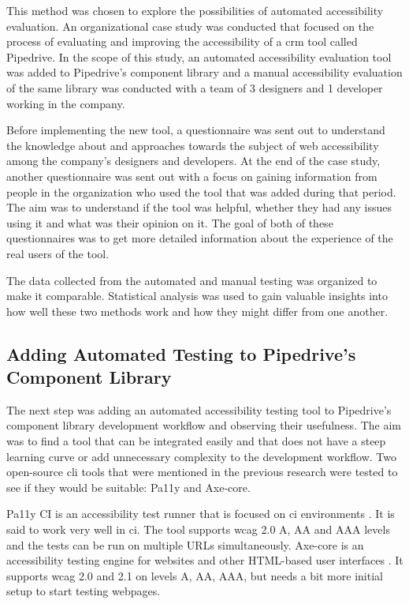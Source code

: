 \documentclass{master_thesis}
\begin{document}
This method was chosen to explore the possibilities of automated accessibility evaluation. An organizational case study was conducted that focused on the process of evaluating and improving the accessibility of a \ac{crm} tool called Pipedrive. In the scope of this study, an automated accessibility evaluation tool was added to Pipedrive's component library and a manual accessibility evaluation of the same library was conducted with a team of 3 designers and 1 developer working in the company.

Before implementing the new tool, a questionnaire was sent out to understand the knowledge about and approaches towards the subject of web accessibility among the company's designers and developers. At the end of the case study, another questionnaire was sent out with a focus on gaining information from people in the organization who used the tool that was added during that period. The aim was to understand if the tool was helpful, whether they had any issues using it and what was their opinion on it. The goal of both of these questionnaires was to get more detailed information about the experience of the real users of the tool.

The data collected from the automated and manual testing was organized to make it comparable. Statistical analysis was used to gain valuable insights into how well these two methods work and how they might differ from one another.

\subsection{Adding Automated Testing to Pipedrive's Component Library} \label{adding-a11y-tool}

The next step was adding an automated accessibility testing tool to Pipedrive's component library development workflow and observing their usefulness. The aim was to find a tool that can be integrated easily and that does not have a steep learning curve or add unnecessary complexity to the development workflow. Two open-source \ac{cli} tools that were mentioned in the previous research were tested to see if they would be suitable: Pa11y and Axe-core.

Pa11y CI is an accessibility test runner that is focused on \ac{ci} environments \citep{TeamPa11y2022}. It is said to work very well in \ac{ci}. The tool supports \ac{wcag} 2.0 A, AA and AAA levels and the tests can be run on multiple URLs simultaneously. Axe-core is an accessibility testing engine for websites and other HTML-based user interfaces \citep{Deque2023}. It supports \ac{wcag} 2.0 and 2.1 on levels A, AA, AAA, but needs a bit more initial setup to start testing webpages.
\end{document}
